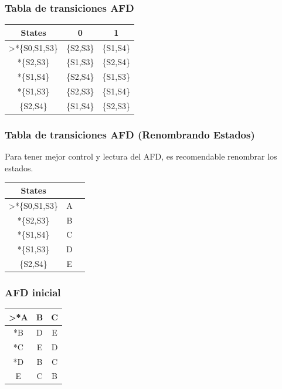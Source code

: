 \documentclass[https://www.overleaf.com/project/63761df255a8a9f4a15c3579
	letterpaper, %
	10pt, %
]{CSUniSchoolLabReport}
\begin{document}
\subsubsection*{Tabla de transiciones AFD}
\begin{tabular}{|c|c|c|}
\hline
States & 0 & 1 \\
\hline
>*\{S0,S1,S3\} & \{S2,S3\} &  \{S1,S4\} \\
\hline
*\{S2,S3\} & \{S1,S3\} & \{S2,S4\} \\
\hline
*\{S1,S4\} & \{S2,S4\} & \{S1,S3\} \\
\hline
*\{S1,S3\} & \{S2,S3\} & \{S1,S4\} \\
\hline
\{S2,S4\} & \{S1,S4\} & \{S2,S3\} \\
\hline
\end{tabular}

\subsubsection*{Tabla de transiciones AFD (Renombrando Estados)}
Para tener mejor control y lectura del AFD, es recomendable renombrar los estados.\\

\begin{tabular}{|c|c|c|}
\hline
States &  \\
\hline
>*\{S0,S1,S3\} & A \\
\hline
*\{S2,S3\} & B \\
\hline
*\{S1,S4\} & C \\
\hline
*\{S1,S3\} & D \\
\hline
\{S2,S4\} & E \\
\hline
\end{tabular}

\subsubsection*{AFD inicial}

\begin{tabular}{|c|c|c|}
\hline
>*A & B & C \\
\hline
*B & D & E \\
\hline
*C & E & D \\
\hline
*D & B & C \\
\hline
E & C & B \\
\hline
\end{tabular}
\end{document}
